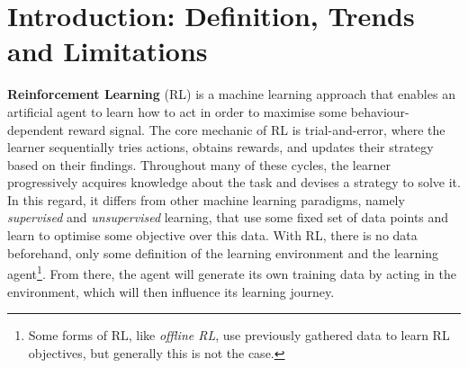 \label{ChapterRL} 




\section{Introduction: Definition, Trends and Limitations}\label{sec:RL:Intro}

\textbf{Reinforcement Learning} (RL) is a machine learning approach that enables an artificial agent to learn how to act in order to maximise some behaviour-dependent reward signal. The core mechanic of RL is trial-and-error, where the learner sequentially tries actions, obtains rewards, and updates their strategy based on their findings. Throughout many of these cycles, the learner progressively acquires knowledge about the task and devises a strategy to solve it. In this regard, it differs from other machine learning paradigms, namely \textit{supervised} and \textit{unsupervised} learning, that use some fixed set of data points and learn to optimise some objective over this data. With RL, there is no data beforehand, only some definition of the learning environment and the learning agent\footnote{Some forms of RL, like \textit{offline RL}, use previously gathered data to learn RL objectives, but generally this is not the case.}. From there, the agent will generate its own training data by acting in the environment, which will then influence its learning journey. 

